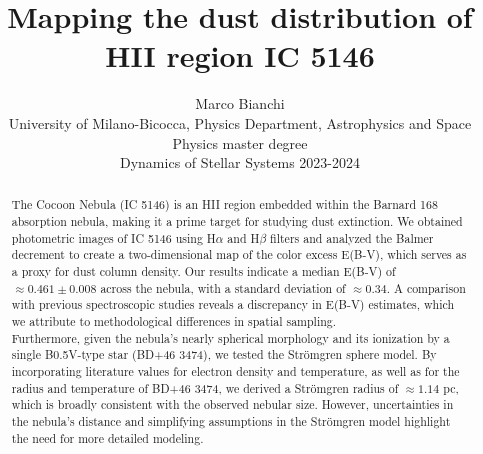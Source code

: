 \documentclass[fleqn,usenatbib]{mnras}
\title[]{Mapping the dust distribution of HII region IC 5146}
\author[Marco Bianchi]{
Marco Bianchi
\\
University of Milano-Bicocca, Physics Department, Astrophysics and Space Physics master degree\\
Dynamics of Stellar Systems 2023-2024
}
\begin{document}
\label{firstpage}
\pagerange{\pageref{firstpage}--\pageref{lastpage}}
\maketitle

\begin{abstract}
  \large The Cocoon Nebula (IC 5146) is an HII region embedded within the Barnard 168 absorption nebula, making it a prime target for studying dust extinction. 
  We obtained photometric images of IC 5146 using H$\alpha$ and H$\beta$ filters and analyzed the Balmer decrement to create a two-dimensional map of the color excess E(B-V), which serves as a proxy for dust column density. 
  Our results indicate a median E(B-V) of $\approx 0.461 \pm 0.008$ across the nebula, with a standard deviation of $\approx 0.34$. 
  A comparison with previous spectroscopic studies reveals a discrepancy in E(B-V) estimates, which we attribute to methodological differences in spatial sampling.\\
  Furthermore, given the nebula's nearly spherical morphology and its ionization by a single B0.5V-type star (BD+46 3474), we tested the Strömgren sphere model. 
  By incorporating literature values for electron density and temperature, as well as for the radius and temperature of BD+46 3474, we derived a Strömgren radius of $\approx 1.14$ pc, which is broadly consistent with the observed nebular size. 
  However, uncertainties in the nebula's distance and simplifying assumptions in the Strömgren model highlight the need for more detailed modeling.
\end{abstract} 




\end{document}
